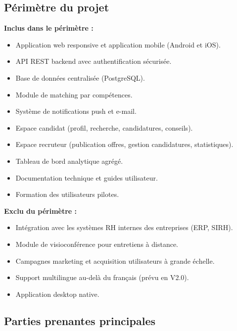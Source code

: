 \documentclass[11pt,a4paper]{article}
\begin{document}
\subsection{Périmètre du projet}

\textbf{Inclus dans le périmètre :}
\begin{itemize}
    \item Application web responsive et application mobile (Android et iOS).
    \item API REST backend avec authentification sécurisée.
    \item Base de données centralisée (PostgreSQL).
    \item Module de matching par compétences.
    \item Système de notifications push et e-mail.
    \item Espace candidat (profil, recherche, candidatures, conseils).
    \item Espace recruteur (publication offres, gestion candidatures, statistiques).
    \item Tableau de bord analytique agrégé.
    \item Documentation technique et guides utilisateur.
    \item Formation des utilisateurs pilotes.
\end{itemize}

\textbf{Exclu du périmètre :}
\begin{itemize}
    \item Intégration avec les systèmes RH internes des entreprises (ERP, SIRH).
    \item Module de visioconférence pour entretiens à distance.
    \item Campagnes marketing et acquisition utilisateurs à grande échelle.
    \item Support multilingue au-delà du français (prévu en V2.0).
    \item Application desktop native.
\end{itemize}

\subsection{Parties prenantes principales}
\end{document}
